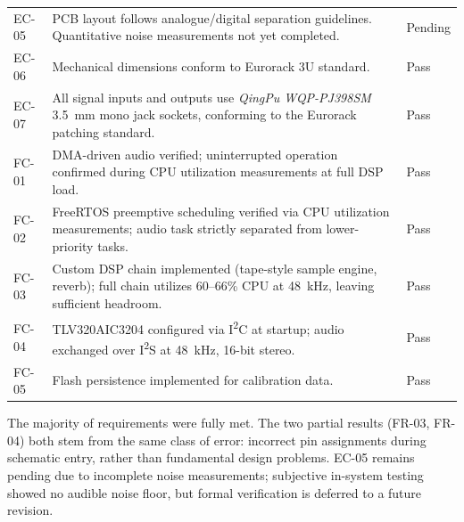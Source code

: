\begin{table}[H]
\begin{tabularx}{\linewidth}{@{} l X l @{}}
		EC-05 & PCB layout follows analogue/digital separation guidelines. Quantitative noise measurements not yet completed. & Pending \\
		EC-06 & Mechanical dimensions conform to Eurorack 3U standard. & Pass \\
		EC-07 & All signal inputs and outputs use \textit{QingPu WQP-PJ398SM} \qty{3.5}{\milli\metre} mono jack sockets, conforming to the Eurorack patching standard. & Pass \\
		\midrule
		FC-01 & DMA-driven audio verified; uninterrupted operation confirmed during CPU utilization measurements at full DSP load. & Pass \\
		FC-02 & FreeRTOS preemptive scheduling verified via CPU utilization measurements; audio task strictly separated from lower-priority tasks. & Pass \\
		FC-03 & Custom DSP chain implemented (tape-style sample engine, reverb); full chain utilizes 60--66\% CPU at \qty{48}{kHz}, leaving sufficient headroom. & Pass \\
		FC-04 & TLV320AIC3204 configured via I\textsuperscript{2}C at startup; audio exchanged over I\textsuperscript{2}S at \qty{48}{kHz}, 16-bit stereo. & Pass \\
		FC-05 & Flash persistence implemented for calibration data. & Pass \\
		\bottomrule
	\end{tabularx}
\end{table}

The majority of requirements were fully met. The two partial results (FR-03, FR-04) both stem from the same class of error: incorrect pin assignments during schematic entry, rather than fundamental design problems.
EC-05 remains pending due to incomplete noise measurements; subjective in-system testing showed no audible noise floor, but formal verification is deferred to a future revision.
